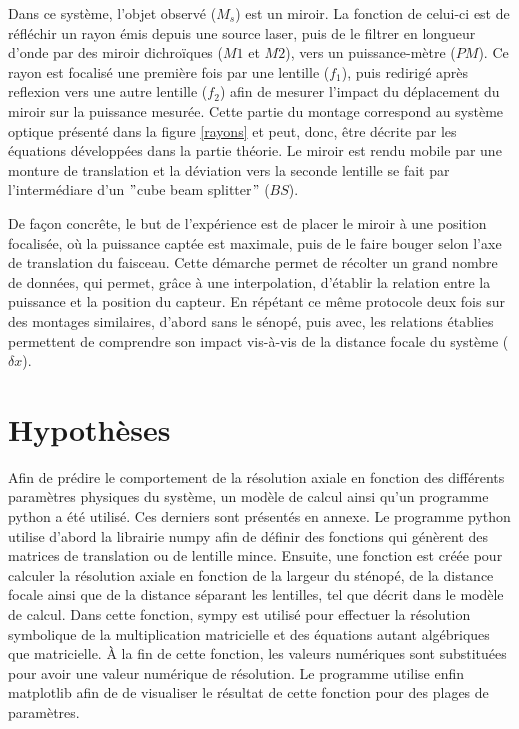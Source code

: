 \documentclass[11pt,letterpaper]{article}
\begin{document}
Dans ce système, l'objet observé ($M_s$) est un miroir. La fonction de celui-ci est de réfléchir un
rayon émis depuis une source laser, puis de le filtrer en longueur d'onde par des miroir dichroïques
($M1$ et $M2$), vers un puissance-mètre ($PM$). Ce rayon est focalisé une première fois par une lentille
($f_1$), puis redirigé après reflexion vers une autre lentille ($f_2$) afin de mesurer l'impact du
déplacement du miroir sur la puissance mesurée. Cette partie du montage correspond au système optique 
présenté dans la figure \ref{rayons} et peut, donc, être décrite par les équations développées dans la
partie théorie. Le miroir est rendu mobile par une monture de translation et la déviation vers la seconde
lentille se fait par l'intermédiare d'un $"$cube beam splitter$"$ ($BS$).

De façon concrête, le but de l'expérience est de placer le miroir à une position focalisée, où la 
puissance captée est maximale, puis de le faire bouger selon l'axe de translation du faisceau. Cette
démarche permet de récolter un grand nombre de données, qui permet, grâce à une interpolation, d'établir
la relation entre la puissance et la position du capteur. En répétant ce même protocole deux fois sur
des montages similaires, d'abord sans le sénopé, puis avec, les relations établies permettent de 
comprendre son impact vis-à-vis de la distance focale du système ($\delta x$). 

\section{Hypothèses}

Afin de prédire le comportement de la résolution axiale en fonction des différents paramètres physiques
du système, un modèle de calcul ainsi qu'un programme python a été utilisé. Ces derniers sont présentés
en annexe. Le programme python utilise d'abord la librairie numpy afin de définir des fonctions qui 
génèrent des matrices de translation ou de lentille mince. Ensuite, une fonction est créée pour calculer
la résolution axiale en fonction de la largeur du sténopé, de la distance focale ainsi que de la distance
séparant les lentilles, tel que décrit dans le modèle de calcul. Dans cette fonction, sympy est utilisé
pour effectuer la résolution symbolique de la multiplication matricielle et des équations autant
algébriques que matricielle. À la fin de cette fonction, les valeurs numériques sont substituées pour
avoir une valeur numérique de résolution. Le programme utilise enfin matplotlib afin de de visualiser
le résultat de cette fonction pour des plages de paramètres.
\end{document}
